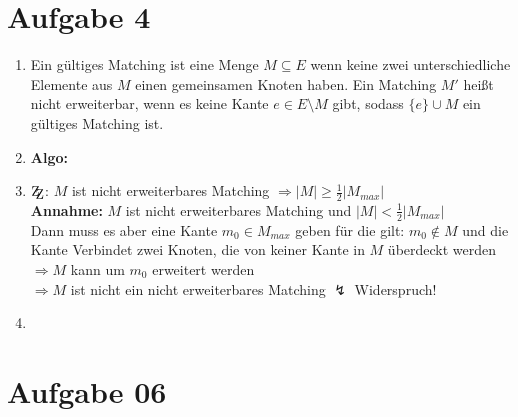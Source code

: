 \documentclass[10pt,a4paper]{article}
\newcommand{\zz}{\mathrm{Z\kern-.3em\raise-0.5ex\hbox{Z}}}
\begin{document}
\section*{Aufgabe 4}

    \begin{enumerate}[label={\alph*)}]
        \item Ein gültiges Matching ist eine Menge $M \subseteq E$ wenn keine
            zwei unterschiedliche Elemente aus $M$ einen gemeinsamen Knoten
            haben.
            Ein Matching $M'$ heißt nicht erweiterbar, wenn es keine Kante
            $ e \in E \setminus M$ gibt, sodass $\{e\} \cup M$ ein gültiges
            Matching ist.
        \item
            \textbf{Algo:}\\
            \begin{algorithm}[H]
                
                
            \end{algorithm}

        \item
            $\zz$: $M$ ist nicht erweiterbares Matching $\Rightarrow
            |M| \geq \frac{1}{2}|M_{max}|$
            \\
            \textbf{Annahme:} $M$ ist nicht erweiterbares Matching und
            $|M| < \frac{1}{2}|M_{max}|$
            \\
            Dann muss es aber eine Kante $m_0 \in M_{max}$ geben für
            die gilt: $m_0 \notin M$ und die Kante Verbindet zwei Knoten,
            die von keiner Kante in $M$ überdeckt werden
            \\
            $\Rightarrow M$ kann um $m_0$ erweitert werden
            \\
            $\Rightarrow M$ ist nicht ein nicht erweiterbares Matching
            $\lightning$ Widerspruch!
        \item

    \end{enumerate}

\section*{Aufgabe 06}
\end{document}
